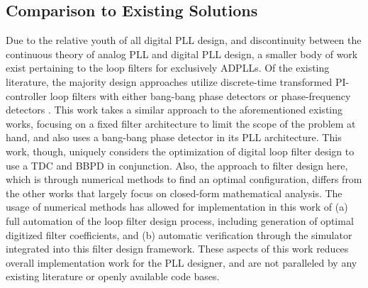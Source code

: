

\FloatBarrier
\subsection{Comparison to Existing Solutions}
Due to the relative youth of all digital PLL design, and discontinuity between the continuous theory of analog PLL and digital PLL design, a smaller body of work exist pertaining to the loop filters for exclusively ADPLLs. Of the existing literature, the majority design approaches utilize discrete-time transformed PI-controller loop filters with either bang-bang phase detectors \cite{zanuso_2009}\cite{xu_abidi_2017}\cite{kratyuk_2007}\cite{safwat_ghoneima_ismail_2011} or phase-frequency detectors \cite{kumm_klingbeil_zipf_2010}\cite{chau_chen_2009}. This work takes a similar approach to the aforementioned existing works, focusing on a fixed filter architecture to limit the scope of the problem at hand, and also uses a bang-bang phase detector in its PLL architecture. This work, though, uniquely considers the optimization of digital loop filter design to use a TDC and BBPD in conjunction. Also, the approach to filter design here, which is through numerical methods to find an optimal configuration, differs from the other works that largely focus on closed-form mathematical analysis. The usage of numerical methods has allowed for implementation in this work of (a) full automation of the loop filter design process, including generation of optimal digitized filter coefficients, and (b) automatic verification through the simulator integrated into this filter design framework. These aspects of this work reduces overall implementation work for the PLL designer, and are not paralleled by any existing literature or openly available code bases. 

